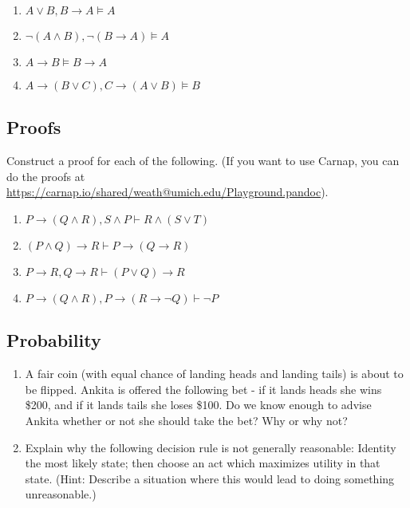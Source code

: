 \documentclass[
  11pt,
]{article}
\providecommand{\tightlist}{%
  \setlength{\itemsep}{0pt}\setlength{\parskip}{0pt}}
\begin{document}
\begin{enumerate}
\def\labelenumi{\arabic{enumi}.}
\setcounter{enumi}{4}
\tightlist
\item
  \(A \vee B, B \rightarrow A \vDash A\)
\item
  \(\neg (A \wedge B), \neg (B \rightarrow A) \vDash A\)
\item
  \(A \rightarrow B \vDash B \rightarrow A\)
\item
  \(A \rightarrow (B \vee C), C \rightarrow (A \vee B) \vDash B\)
\end{enumerate}

\newpage

\hypertarget{proofs}{%
\subsection{Proofs}\label{proofs}}

Construct a proof for each of the following. (If you want to use Carnap,
you can do the proofs at
\url{https://carnap.io/shared/weath@umich.edu/Playground.pandoc}).

\begin{enumerate}
\def\labelenumi{\arabic{enumi}.}
\setcounter{enumi}{8}
\tightlist
\item
  \(P \rightarrow (Q \wedge R), S \wedge P \vdash R \wedge (S \vee T)\)
\item
  \((P \wedge Q) \rightarrow R \vdash P \rightarrow (Q \rightarrow R)\)
\item
  \(P \rightarrow R, Q \rightarrow R \vdash (P \vee Q) \rightarrow R\)
\item
  \(P \rightarrow (Q \wedge R), P \rightarrow (R \rightarrow \neg Q) \vdash \neg P\)
\end{enumerate}

\hypertarget{probability}{%
\subsection{Probability}\label{probability}}

\begin{enumerate}
\def\labelenumi{\arabic{enumi}.}
\setcounter{enumi}{12}
\tightlist
\item
  A fair coin (with equal chance of landing heads and landing tails) is
  about to be flipped. Ankita is offered the following bet - if it lands
  heads she wins \$200, and if it lands tails she loses \$100. Do we
  know enough to advise Ankita whether or not she should take the bet?
  Why or why not?
\item
  Explain why the following decision rule is not generally reasonable:
  Identity the most likely state; then choose an act which maximizes
  utility in that state. (Hint: Describe a situation where this would
  lead to doing something unreasonable.)
\end{enumerate}
\end{document}
